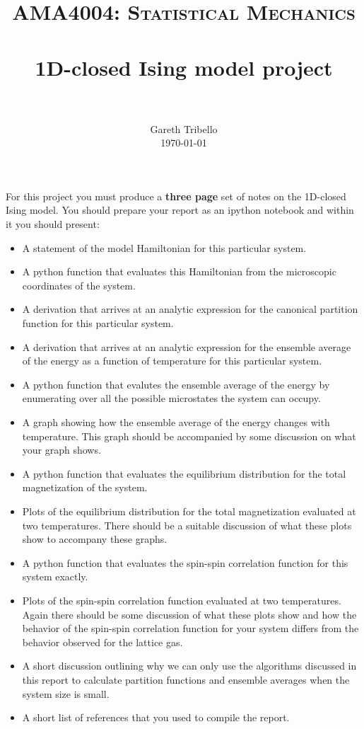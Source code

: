 \documentclass[paper=a4, fontsize=11pt]{scrartcl}
\title{\usefont{OT1}{bch}{b}{n} \normalfont \normalsize \textsc{AMA4004:
Statistical Mechanics} \\ [25pt] \horrule{0.5pt} \\[0.4cm] 
\huge 1D-closed Ising model project \\
\horrule{2pt} \\[0.25cm]
}
\author{ \normalfont
\normalsize
        Gareth Tribello \\[-3pt] \normalsize
        \today
}
\date{}
\numberwithin{equation}{section}
\numberwithin{figure}{section}
\numberwithin{table}{section}
\begin{document}
\maketitle

For this project you must produce a {\bf three page} set of notes on the 1D-closed Ising model.  You should prepare your report as an ipython notebook and within 
it you should present:

\begin{itemize}
 \item A statement of the model Hamiltonian for this particular system.
 \item A python function that evaluates this Hamiltonian from the microscopic coordinates of the system. 
 \item A derivation that arrives at an analytic expression for the canonical partition function for this particular system.
 \item A derivation that arrives at an analytic expression for the ensemble average of the energy as a function of temperature for this particular system.
 \item A python function that evalutes the ensemble average of the energy by enumerating over all the possible microstates the system can occupy.  
 \item A graph showing how the ensemble average of the energy changes with temperature.  This graph should be accompanied by some discussion on what your graph shows.
 \item A python function that evaluates the equilibrium distribution for the total magnetization of the system.
 \item Plots of the equilibrium distribution for the total magnetization evaluated at two temperatures.  There should be a suitable discussion of what these plots show to accompany these graphs.
 \item A python function that evaluates the spin-spin correlation function for this system exactly.
 \item Plots of the spin-spin correlation function evaluated at two temperatures.  Again there should be some discussion of what these plots show and how the behavior of the spin-spin correlation function for your system differs from the behavior observed for the lattice gas.
 \item A short discussion outlining why we can only use the algorithms discussed in this report to calculate partition functions and ensemble averages when the system size is small.
 \item A short list of references that you used to compile the report.
\end{itemize}
\end{document}
